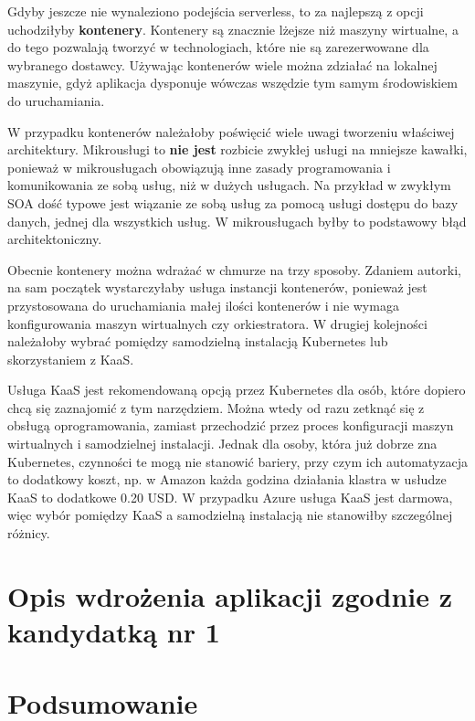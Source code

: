 \documentclass[12pt,a4paper,twoside,titlepage,openright]{book}
\begin{document}
Gdyby jeszcze nie wynaleziono podejścia serverless, to za najlepszą z opcji uchodziłyby \textbf{kontenery}. Kontenery są znacznie lżejsze niż maszyny wirtualne, a do tego pozwalają tworzyć w technologiach, które nie są zarezerwowane dla wybranego dostawcy. Używając kontenerów wiele można zdziałać na lokalnej maszynie, gdyż aplikacja dysponuje wówczas wszędzie tym samym środowiskiem do uruchamiania. 

W przypadku kontenerów należałoby poświęcić wiele uwagi tworzeniu właściwej architektury. Mikrousługi to \textbf{nie jest} rozbicie zwykłej usługi na mniejsze kawałki, ponieważ w mikrousługach obowiązują inne zasady programowania i komunikowania ze sobą usług, niż w dużych usługach. Na przykład w zwykłym SOA dość typowe jest wiązanie ze sobą usług za pomocą usługi dostępu do bazy danych, jednej dla wszystkich usług. W mikrousługach byłby to podstawowy błąd architektoniczny. 

Obecnie kontenery można wdrażać w chmurze na trzy sposoby. Zdaniem autorki, na sam początek wystarczyłaby usługa instancji kontenerów, ponieważ jest przystosowana do uruchamiania małej ilości kontenerów i nie wymaga konfigurowania maszyn wirtualnych czy orkiestratora. W drugiej kolejności należałoby wybrać pomiędzy samodzielną instalacją Kubernetes lub skorzystaniem z KaaS. 

Usługa KaaS jest rekomendowaną opcją przez Kubernetes dla osób, które dopiero chcą się zaznajomić z tym narzędziem. Można wtedy od razu zetknąć się z obsługą oprogramowania, zamiast przechodzić przez proces konfiguracji maszyn wirtualnych i samodzielnej instalacji. Jednak dla osoby, która już dobrze zna Kubernetes, czynności te mogą nie stanowić bariery, przy czym ich automatyzacja to dodatkowy koszt, np. w Amazon każda godzina działania klastra w usłudze KaaS to dodatkowe 0.20 USD. W przypadku Azure usługa KaaS jest darmowa, więc wybór pomiędzy KaaS a samodzielną instalacją nie stanowiłby szczególnej różnicy.





\chapter{Opis wdrożenia aplikacji zgodnie z kandydatką nr 1 }
 
\chapter*{Podsumowanie}
 
 
 
 
\listoffigures

\listoftables



\printbibliography
 
\end{document}
